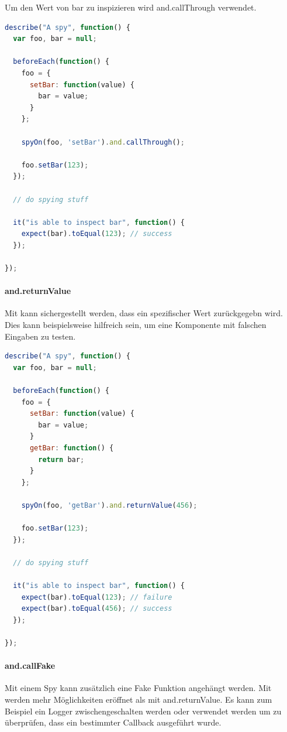 Um den Wert von bar zu inspizieren wird and.callThrough verwendet.
\begin{lstlisting}[language=JavaScript]
describe("A spy", function() {
  var foo, bar = null;

  beforeEach(function() {
    foo = {
      setBar: function(value) {
        bar = value;
      }
    };

    spyOn(foo, 'setBar').and.callThrough();

    foo.setBar(123);
  });

  // do spying stuff

  it("is able to inspect bar", function() {
    expect(bar).toEqual(123); // success
  });

});
\end{lstlisting}

\paragraph{and.returnValue}
Mit  kann sichergestellt werden, dass ein spezifischer Wert zurückgegebn wird. Dies kann beispielsweise hilfreich sein, um eine Komponente mit falschen Eingaben zu testen.

\begin{lstlisting}[language=JavaScript]
describe("A spy", function() {
  var foo, bar = null;

  beforeEach(function() {
    foo = {
      setBar: function(value) {
        bar = value;
      }
      getBar: function() {
        return bar;
      }
    };

    spyOn(foo, 'getBar').and.returnValue(456);

    foo.setBar(123);
  });

  // do spying stuff

  it("is able to inspect bar", function() {
    expect(bar).toEqual(123); // failure
    expect(bar).toEqual(456); // success
  });

});
\end{lstlisting}

\paragraph{and.callFake}
Mit einem Spy kann zusätzlich eine Fake Funktion angehängt werden. Mit  werden mehr Möglichkeiten eröffnet als mit and.returnValue. Es kann zum Beispiel ein Logger zwischengeschalten werden oder verwendet werden um zu überprüfen, dass ein bestimmter Callback ausgeführt wurde.

